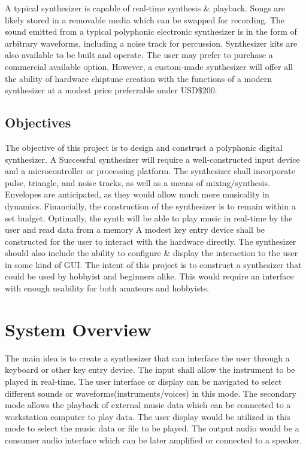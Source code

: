 \documentclass[abstract=on,paper=a4, fontsize=12pt]{scrartcl}		%
\begin{document}
    \par A typical synthesizer is capable of real-time synthesis \& playback. Songs are likely stored in a removable media which can be swapped for recording. The sound emitted from a typical polyphonic electronic synthesizer is in the form of arbitrary waveforms, including a noise track for percussion.
    Synthesizer kits are also available to be built and operate. The user may prefer to purchase a commercial available option, However, a custom-made synthesizer will offer all the ability of hardware chiptune creation with the functions of a modern synthesizer at a modest price preferrable under USD\$200. 
  \subsection{Objectives}
    \par The objective of this project is to design and construct a polyphonic digital synthesizer. A Successful synthesizer will require a well-constructed input device and a microcontroller or processing platform. The synthesizer shall incorporate pulse, triangle, and noise tracks, as well as a means of mixing/synthesis. Envelopes are anticipated, as they would allow much more musicality in dynamics. Financially, the construction of the synthesizer is to remain within a set budget. Optimally, the synth will be able to play music in real-time by the user and read data from a memory A modest key entry device shall be constructed for the user to interact with the hardware directly. The synthesizer should also include the ability to configure \& display the interaction to the user in some kind of GUI. The intent of this project is to construct a synthesizer that could be used by hobbyist and beginners alike. This would require an interface with enough usability for both amateurs and hobbyists.
\section{System Overview}
    The main idea is to create a synthesizer that can interface the user through a keyboard or other key entry device. The input shall allow the instrument to be played in real-time. The user interface or display can be navigated to select different sounds or waveforms(instruments/voices) in this mode. The secondary mode allows the playback of external music data which can be connected to a workstation computer to play data. The user display would be utilized in this mode to select the music data or file to be played. The output audio would be a consumer audio interface which can be later amplified or connected to a speaker.
\end{document}

